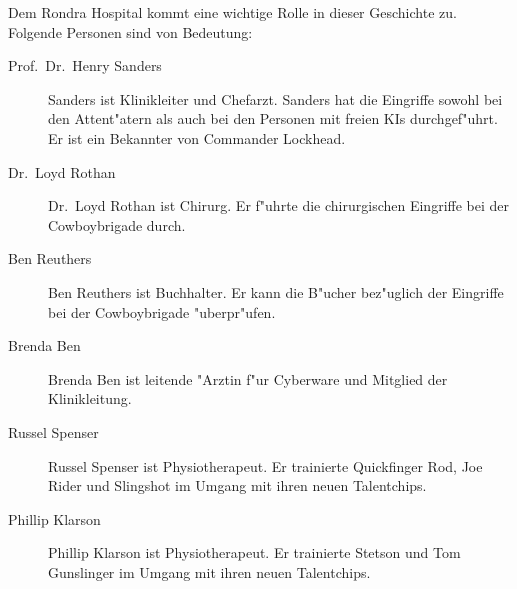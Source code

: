
Dem Rondra Hospital kommt eine wichtige Rolle in dieser Geschichte zu. Folgende Personen sind von Bedeutung:

\begin{description}
    \item[Prof.~Dr.~Henry Sanders] Sanders ist Klinikleiter und Chefarzt. Sanders hat die Eingriffe sowohl bei den Attent"atern als auch 
        bei den Personen mit freien KIs durchgef"uhrt. Er ist ein Bekannter von Commander Lockhead.
    \item[Dr.~Loyd Rothan] Dr.~Loyd Rothan ist Chirurg. Er f"uhrte die chirurgischen Eingriffe bei der Cowboybrigade durch.
    \item[Ben Reuthers] Ben Reuthers ist Buchhalter. Er kann die B"ucher bez"uglich der Eingriffe bei der Cowboybrigade "uberpr"ufen.
    \item[Brenda Ben] Brenda Ben ist leitende "Arztin f"ur Cyberware und Mitglied der Klinikleitung.
    \item[Russel Spenser] Russel Spenser ist Physiotherapeut. Er trainierte Quickfinger Rod, Joe Rider und Slingshot im Umgang mit ihren 
        neuen Talentchips.
    \item[Phillip Klarson] Phillip Klarson ist Physiotherapeut. Er trainierte Stetson und Tom Gunslinger im Umgang mit ihren neuen 
        Talentchips.
\end{description}
